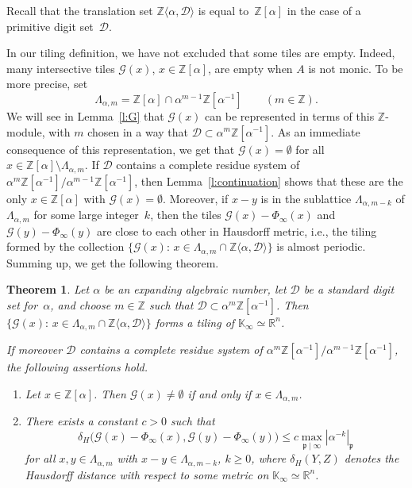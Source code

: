 \documentclass[12pt]{amsart}
\newtheorem{theorem}{Theorem}
\theoremstyle{definition}
\theoremstyle{remark}
\numberwithin{equation}{section}
\begin{document}
Recall that the translation set $\mathbb{Z}\langle \alpha, \mathcal{D}\rangle$ is equal to~$\mathbb{Z}[\alpha]$ in the case of a primitive digit set~$\mathcal{D}$.

In our tiling definition, we have not excluded that some tiles are empty.
Indeed, many intersective tiles $\mathcal{G}(x)$, $x \in \mathbb{Z}[\alpha]$, are empty when $A$ is not monic.
To be more precise, set
\[
\Lambda_{\alpha,m} = \mathbb{Z}[\alpha] \cap \alpha^{m-1} \mathbb{Z}[\alpha^{-1}] \qquad (m \in \mathbb{Z}).
\]
We will see in Lemma~\ref{l:G} that $\mathcal{G}(x)$ can be represented in terms of this $\mathbb{Z}$-module, with $m$ chosen in a way that $\mathcal{D} \subset \alpha^{m}\mathbb{Z}[\alpha^{-1}]$.
As an immediate consequence of this representation, we get that $\mathcal{G}(x) = \emptyset$ for all $x \in \mathbb{Z}[\alpha] \setminus \Lambda_{\alpha,m}$.
If $\mathcal{D}$ contains a complete residue system of $\alpha^m \mathbb{Z}[\alpha^{-1}] / \alpha^{m-1} \mathbb{Z}[\alpha^{-1}]$, then Lemma~\ref{l:continuation} shows that these are the only $x \in \mathbb{Z}[\alpha]$ with $\mathcal{G}(x) = \emptyset$.
Moreover, if $x-y$ is in the sublattice $\Lambda_{\alpha,m-k}$ of $\Lambda_{\alpha,m}$ for some large integer~$k$, then the tiles $\mathcal{G}(x) - \Phi_\infty(x)$ and $\mathcal{G}(y) - \Phi_\infty(y)$ are close to each other in Hausdorff metric, i.e., the tiling formed by the collection $\{\mathcal{G}(x):\, x \in \Lambda_{\alpha,m} \cap \mathbb{Z}\langle \alpha, \mathcal{D}\rangle\}$ is almost periodic.
Summing up, we get the following theorem.

\begin{theorem} \label{t:24}
Let $\alpha$ be an expanding algebraic number, let $\mathcal{D}$ be a standard digit set for~$\alpha$, and choose $m \in \mathbb{Z}$ such that $\mathcal{D} \subset \alpha^{m}\mathbb{Z}[\alpha^{-1}]$.
Then $\{\mathcal{G}(x):\, x \in \Lambda_{\alpha,m} \cap \mathbb{Z}\langle \alpha, \mathcal{D}\rangle\}$ forms a tiling of $\mathbb{K}_\infty \simeq \mathbb{R}^n$.

If moreover $\mathcal{D}$ contains a complete residue system of $\alpha^m \mathbb{Z}[\alpha^{-1}] / \alpha^{m-1} \mathbb{Z}[\alpha^{-1}]$, the following assertions hold.

\begin{enumerate}
\itemsep1ex
\item \label{Gnotempty}
Let $x\in\mathbb{Z}[\alpha]$. Then $\mathcal{G}(x) \ne \emptyset$ if and only if $x \in \Lambda_{\alpha,m}$.
\item \label{almostperiodic}
There exists a constant $c > 0$ such that
\[
\delta_H\big(\mathcal{G}(x) - \Phi_\infty(x), \mathcal{G}(y) - \Phi_\infty(y)\big) \le c \max_{\mathfrak{p}\mid\infty} |\alpha^{-k}|_\mathfrak{p}
\]
for all $x,y \in \Lambda_{\alpha,m}$ with $x-y \in \Lambda_{\alpha,m-k}$, $k \ge 0$, where $\delta_H(Y,Z)$ denotes the Hausdorff distance with respect to some metric on $\mathbb{K}_\infty \simeq \mathbb{R}^n$.
\end{enumerate}
\end{theorem}
\end{document}
